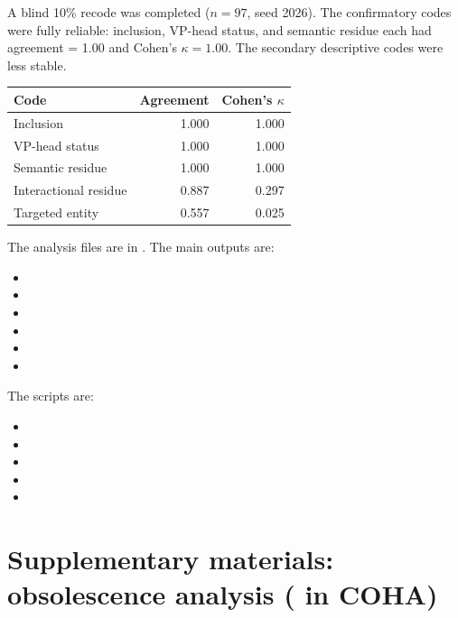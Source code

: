 \documentclass[12pt]{article}
\begin{document}
A blind 10\% recode was completed ($n=97$, seed 2026). The
confirmatory codes were fully reliable: inclusion, VP-head status, and
semantic residue each had agreement = 1.00 and Cohen's $\kappa = 1.00$.
The secondary descriptive codes were less stable.

\begin{center}
\begin{tabular}{lrr}
  \toprule
  Code & Agreement & Cohen's $\kappa$ \\
  \midrule
  Inclusion & 1.000 & 1.000 \\
  VP-head status & 1.000 & 1.000 \\
  Semantic residue & 1.000 & 1.000 \\
  Interactional residue & 0.887 & 0.297 \\
  Targeted entity & 0.557 & 0.025 \\
  \bottomrule
\end{tabular}
\end{center}

The analysis files are in . The
main outputs are:

\begin{itemize}
  \item {}
  \item {}
  \item {}
  \item {}
  \item {}
  \item {}
\end{itemize}

The scripts are:

\begin{itemize}
  \item {}
  \item {}
  \item {}
  \item {}
  \item {}
\end{itemize}

\clearpage
\section[Fie in COHA]{Supplementary materials: obsolescence analysis ( in COHA)}
\label{app:fie}
\end{document}
